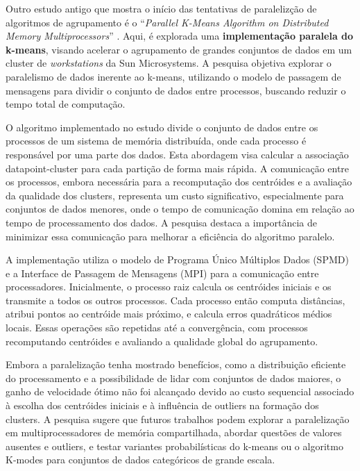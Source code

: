 \documentclass[12pt,
openright, 
oneside, %
a4paper,    %
brazil]{facom-ufu-abntex2}
\begin{document}
Outro estudo antigo que mostra o início das tentativas de paralelizção de algoritmos de agrupamento é o \enquote{\textit{Parallel K-Means Algorithm on Distributed Memory Multiprocessors}} \cite{parallelKMeansJoshi2003}. Aqui, é explorada uma \textbf{implementação paralela do k-means}, visando acelerar o agrupamento de grandes conjuntos de dados em um cluster de \textit{workstations} da Sun Microsystems. A pesquisa objetiva explorar o paralelismo de dados inerente ao k-means, utilizando o modelo de passagem de mensagens para dividir o conjunto de dados entre processos, buscando reduzir o tempo total de computação.

O algoritmo implementado no estudo divide o conjunto de dados entre os processos de um sistema de memória distribuída, onde cada processo é responsável por uma parte dos dados. Esta abordagem visa calcular a associação datapoint-cluster para cada partição de forma mais rápida. A comunicação entre os processos, embora necessária para a recomputação dos centróides e a avaliação da qualidade dos clusters, representa um custo significativo, especialmente para conjuntos de dados menores, onde o tempo de comunicação domina em relação ao tempo de processamento dos dados. A pesquisa destaca a importância de minimizar essa comunicação para melhorar a eficiência do algoritmo paralelo.

A implementação utiliza o modelo de Programa Único Múltiplos Dados (SPMD) e a Interface de Passagem de Mensagens (MPI) para a comunicação entre processadores. Inicialmente, o processo raiz calcula os centróides iniciais e os transmite a todos os outros processos. Cada processo então computa distâncias, atribui pontos ao centróide mais próximo, e calcula erros quadráticos médios locais. Essas operações são repetidas até a convergência, com processos recomputando centróides e avaliando a qualidade global do agrupamento.

Embora a paralelização tenha mostrado benefícios, como a distribuição eficiente do processamento e a possibilidade de lidar com conjuntos de dados maiores, o ganho de velocidade ótimo não foi alcançado devido ao custo sequencial associado à escolha dos centróides iniciais e à influência de outliers na formação dos clusters. A pesquisa sugere que futuros trabalhos podem explorar a paralelização em multiprocessadores de memória compartilhada, abordar questões de valores ausentes e outliers, e testar variantes probabilísticas do k-means ou o algoritmo K-modes para conjuntos de dados categóricos de grande escala.
\end{document}
